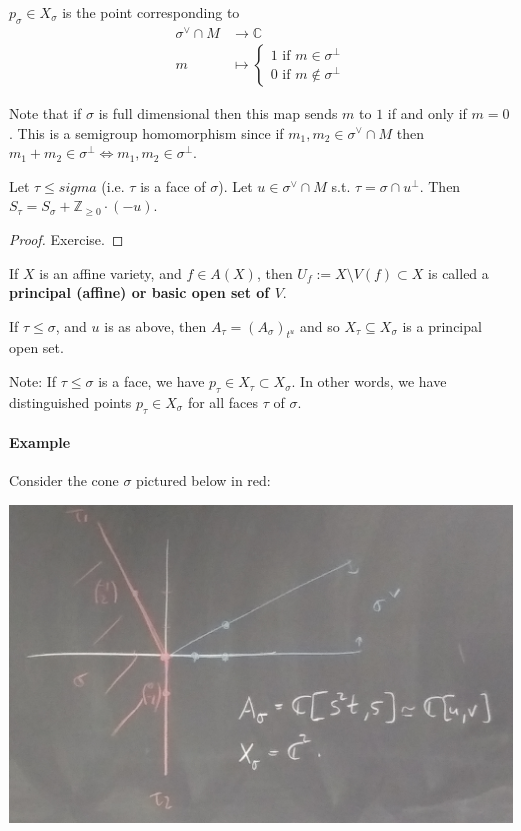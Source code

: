 \documentclass[a4paper,12pt]{amsart}
\newcommand{\ZZ}{\mathbb{Z}}
\newcommand{\CC}{\mathbb{C}}
\begin{document}
\begin{Def}
$p_\sigma \in X_\sigma$ is the point corresponding to 
\begin{align*}
\sigma^\vee \cap M &\to \CC \\
m &\mapsto \begin{cases}
1 \text{ if } m \in \sigma^\perp \\
0 \text{ if } m \not \in \sigma^\perp
\end{cases}
\end{align*}
\end{Def}
Note that if $\sigma$ is full dimensional then this map sends $m$ to $1$ if and only if $m = 0$. This is a semigroup homomorphism since if $m_1, m_2 \in \sigma^\vee \cap M$ then $m_1 + m_2 \in \sigma^\perp \iff m_1, m_2 \in \sigma^\perp$.

\begin{Proposition}
	Let $\tau \leq sigma$ (i.e. $\tau$ is a face of $\sigma$). Let $u \in \sigma^\vee \cap M$ s.t. $\tau = \sigma \cap u^\perp$. Then $S_\tau = S_\sigma + \ZZ_{\geq 0} \cdot (-u)$. 
\end{Proposition}
\begin{proof}
Exercise.
\end{proof}

\begin{Def}
If $X$ is an affine variety, and $f \in A(X)$, then $U_f := X \setminus V(f) \subset X$ is called a \textbf{ principal (affine) or basic open set of $V$}.
\end{Def}

\begin{Corollary}
If $\tau \leq \sigma$, and $u$ is as above, then $A_\tau = (A_\sigma)_{t^{u}}$ and so $X_\tau \subseteq X_\sigma$ is a principal open set. 
\end{Corollary}
Note: If $\tau \leq \sigma$ is a face, we have $p_\tau \in X_\tau \subset X_\sigma$. In other words, we have distinguished points $p_\tau \in X_\sigma$ for all faces $\tau$ of $\sigma$.

\paragraph{Example}
Consider the cone $\sigma$ pictured below in red:

\begin{center}
	\includegraphics[scale=0.2]{pic/toricvar_feb7_1}
\end{center}
\end{document}
